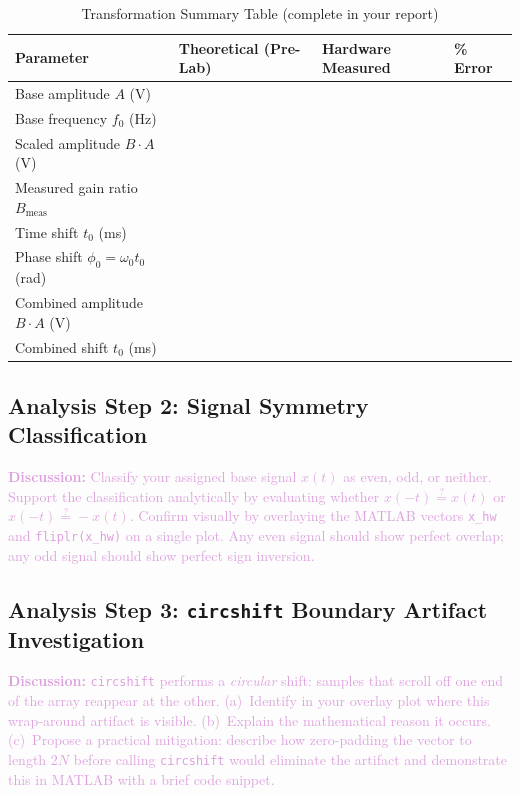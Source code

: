 \documentclass[11pt,letterpaper]{article}
\providecommand{\disECE}[1]{\textcolor{Plum}{\textbf{Discussion:} #1}}
\begin{document}
\begin{table}[H]
    \centering
    \caption{Transformation Summary Table (complete in your report)}
    \label{tab:summary}
    \begin{tabularx}{\linewidth}{l X X X}
    \toprule
    \textbf{Parameter} & \textbf{Theoretical (Pre-Lab)} & \textbf{Hardware Measured} & \textbf{\% Error}\\
    \midrule
    Base amplitude $A$ (V)               & & & \\
    Base frequency $f_0$ (Hz)            & & & \\
    Scaled amplitude $B\cdot A$ (V)      & & & \\
    Measured gain ratio $B_{\text{meas}}$& & & \\
    Time shift $t_0$ (ms)                & & & \\
    Phase shift $\phi_0 = \omega_0 t_0$ (rad) & & & \\
    Combined amplitude $B\cdot A$ (V)    & & & \\
    Combined shift $t_0$ (ms)            & & & \\
    \bottomrule
    \end{tabularx}
\end{table}

\subsection{Analysis Step 2: Signal Symmetry Classification}
\disECE{Classify your assigned base signal $x(t)$ as even, odd, or neither. Support the classification analytically by evaluating whether $x(-t) \stackrel{?}{=} x(t)$ or $x(-t) \stackrel{?}{=} -x(t)$. Confirm visually by overlaying the MATLAB vectors \texttt{x\_hw} and \texttt{fliplr(x\_hw)} on a single plot. Any even signal should show perfect overlap; any odd signal should show perfect sign inversion.}

\subsection{Analysis Step 3: \texttt{circshift} Boundary Artifact Investigation}
\disECE{\texttt{circshift} performs a \emph{circular} shift: samples that scroll off one end of the array reappear at the other. (a)~Identify in your overlay plot where this wrap-around artifact is visible. (b)~Explain the mathematical reason it occurs. (c)~Propose a practical mitigation: describe how zero-padding the vector to length $2N$ before calling \texttt{circshift} would eliminate the artifact and demonstrate this in MATLAB with a brief code snippet.}
\end{document}
